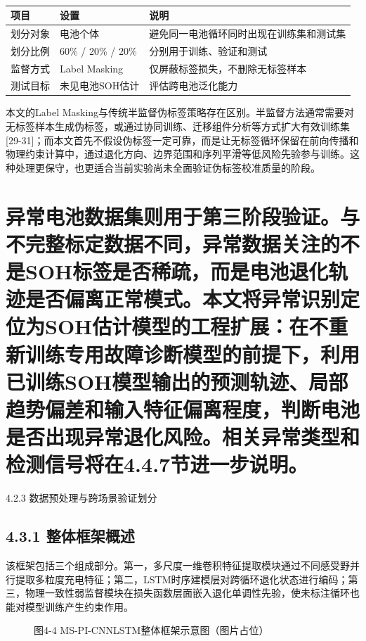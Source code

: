 \documentclass[12pt, a4paper]{ctexart}
\begin{document}
\begin{table}[H]
  \centering
  \begin{tabular}{lll}
  \toprule
  项目 & 设置 & 说明 \\
  \midrule
  划分对象 & 电池个体 & 避免同一电池循环同时出现在训练集和测试集 \\
  划分比例 & 60\% / 20\% / 20\% & 分别用于训练、验证和测试 \\
  监督方式 & Label Masking & 仅屏蔽标签损失，不删除无标签样本 \\
  测试目标 & 未见电池SOH估计 & 评估跨电池泛化能力 \\
  \bottomrule
  \end{tabular}
  \caption{}
  \label{tab:}
\end{table}

本文的Label Masking与传统半监督伪标签策略存在区别。半监督方法通常需要对无标签样本生成伪标签，或通过协同训练、迁移组件分析等方式扩大有效训练集[29-31]；而本文首先不假设伪标签一定可靠，而是让无标签循环保留在前向传播和物理约束计算中，通过退化方向、边界范围和序列平滑等低风险先验参与训练。这种处理更保守，也更适合当前实验尚未全面验证伪标签校准质量的阶段。



\section{异常电池数据集则用于第三阶段验证。与不完整标定数据不同，异常数据关注的不是SOH标签是否稀疏，而是电池退化轨迹是否偏离正常模式。本文将异常识别定位为SOH估计模型的工程扩展：在不重新训练专用故障诊断模型的前提下，利用已训练SOH模型输出的预测轨迹、局部趋势偏差和输入特征偏离程度，判断电池是否出现异常退化风险。相关异常类型和检测信号将在4.4.7节进一步说明。}

4.2.3 数据预处理与跨场景验证划分



\subsection{4.3.1 整体框架概述}

该框架包括三个组成部分。第一，多尺度一维卷积特征提取模块通过不同感受野并行提取多粒度充电特征；第二，LSTM时序建模层对跨循环退化状态进行编码；第三，物理一致性弱监督模块在损失函数层面嵌入退化单调性先验，使未标注循环也能对模型训练产生约束作用。



\begin{figure}[H]
  \centering
  \caption{图4-4  MS-PI-CNNLSTM整体框架示意图（图片占位）}
  \label{fig:}
\end{figure}
\end{document}
